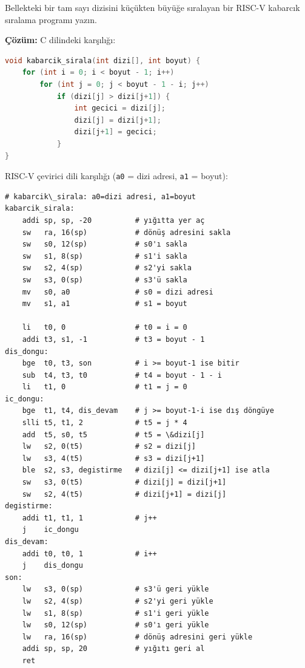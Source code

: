 \begin{ornek}[4.8]
\label{orn:kabarcik-siralama}
Bellekteki bir tam sayı dizisini küçükten büyüğe sıralayan bir RISC-V kabarcık sıralama programı yazın.

\textbf{Çözüm:} C dilindeki karşılığı:

\begin{lstlisting}[language=C, style=alistirma-kod]
void kabarcik_sirala(int dizi[], int boyut) {
    for (int i = 0; i < boyut - 1; i++)
        for (int j = 0; j < boyut - 1 - i; j++)
            if (dizi[j] > dizi[j+1]) {
                int gecici = dizi[j];
                dizi[j] = dizi[j+1];
                dizi[j+1] = gecici;
            }
}
\end{lstlisting}

RISC-V çevirici dili karşılığı (\texttt{a0} = dizi adresi, \texttt{a1} = boyut):

\begin{lstlisting}[style=riscv]
# kabarcik\_sirala: a0=dizi adresi, a1=boyut
kabarcik_sirala:
    addi sp, sp, -20          # yığıtta yer aç
    sw   ra, 16(sp)           # dönüş adresini sakla
    sw   s0, 12(sp)           # s0'ı sakla
    sw   s1, 8(sp)            # s1'i sakla
    sw   s2, 4(sp)            # s2'yi sakla
    sw   s3, 0(sp)            # s3'ü sakla
    mv   s0, a0               # s0 = dizi adresi
    mv   s1, a1               # s1 = boyut

    li   t0, 0                # t0 = i = 0
    addi t3, s1, -1           # t3 = boyut - 1
dis_dongu:
    bge  t0, t3, son          # i >= boyut-1 ise bitir
    sub  t4, t3, t0           # t4 = boyut - 1 - i
    li   t1, 0                # t1 = j = 0
ic_dongu:
    bge  t1, t4, dis_devam    # j >= boyut-1-i ise dış döngüye
    slli t5, t1, 2            # t5 = j * 4
    add  t5, s0, t5           # t5 = \&dizi[j]
    lw   s2, 0(t5)            # s2 = dizi[j]
    lw   s3, 4(t5)            # s3 = dizi[j+1]
    ble  s2, s3, degistirme   # dizi[j] <= dizi[j+1] ise atla
    sw   s3, 0(t5)            # dizi[j] = dizi[j+1]
    sw   s2, 4(t5)            # dizi[j+1] = dizi[j]
degistirme:
    addi t1, t1, 1            # j++
    j    ic_dongu
dis_devam:
    addi t0, t0, 1            # i++
    j    dis_dongu
son:
    lw   s3, 0(sp)            # s3'ü geri yükle
    lw   s2, 4(sp)            # s2'yi geri yükle
    lw   s1, 8(sp)            # s1'i geri yükle
    lw   s0, 12(sp)           # s0'ı geri yükle
    lw   ra, 16(sp)           # dönüş adresini geri yükle
    addi sp, sp, 20           # yığıtı geri al
    ret
\end{lstlisting}


\end{ornek}
